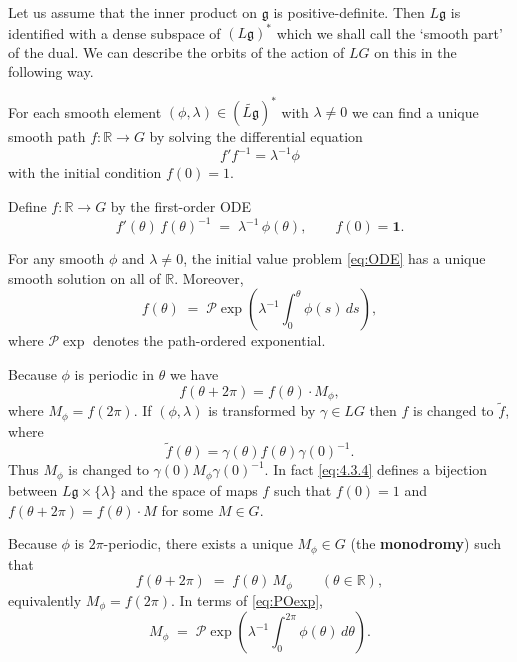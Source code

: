 \documentclass[12pt]{article}
\begin{document}
Let us assume that the inner product on $\mathfrak{g}$ is positive-definite.
Then $L\mathfrak{g}$ is identified with a dense subspace of $(L\mathfrak{g})^*$
which we shall call the ‘smooth part’ of the dual. We can describe the orbits of
the action of $LG$ on this in the following way.

For each smooth element $(\phi,\lambda) \in (\widetilde{L\mathfrak{g}})^*$
with $\lambda \neq 0$ we can find a unique smooth path $f : \mathbb{R} \to G$
by solving the differential equation
\begin{equation} \label{eq:4.3.4}
    f'f^{-1} = \lambda^{-1}\phi
\end{equation}
with the initial condition $f(0)=1$.

\begin{definition}
    Define $f:\mathbb R\to G$ by the first-order ODE
    \begin{equation}\label{eq:ODE}
        f'(\theta)\,f(\theta)^{-1} \;=\; \lambda^{-1}\,\phi(\theta),
        \qquad f(0)=\mathbf{1}.
    \end{equation}
\end{definition}

\begin{lemma}
    For any smooth $\phi$ and $\lambda\neq 0$, the initial value problem
    \eqref{eq:ODE} has a unique smooth solution on all of $\mathbb R$. Moreover,
    \begin{equation}\label{eq:POexp}
        f(\theta) \;=\; \mathcal P\exp\!\left(\lambda^{-1}
        \int_0^\theta \phi(s)\,ds\right),
    \end{equation}
    where $\mathcal P\exp$ denotes the path-ordered exponential.
\end{lemma}

Because $\phi$ is periodic in $\theta$ we have
\[
    f(\theta+2\pi) = f(\theta)\cdot M_\phi,
\]
where $M_\phi = f(2\pi)$. If $(\phi,\lambda)$ is transformed by $\gamma \in LG$
then $f$ is changed to $\tilde{f}$, where
\begin{equation} \label{eq:4.3.5}
    \tilde{f}(\theta) = \gamma(\theta) f(\theta) \gamma(0)^{-1}.
\end{equation}
Thus $M_\phi$ is changed to $\gamma(0)M_\phi \gamma(0)^{-1}$. In fact
\eqref{eq:4.3.4} defines a bijection between $L\mathfrak{g} \times \{\lambda\}$
and the space of maps $f$ such that $f(0)=1$ and
$f(\theta+2\pi)=f(\theta)\cdot M$ for some $M \in G$.

\begin{definition}
    Because $\phi$ is $2\pi$-periodic, there exists a unique $M_\phi\in G$
    (the \textbf{monodromy}) such that
    \begin{equation}\label{eq:monodromy-eq}
        f(\theta+2\pi) \;=\; f(\theta)\,M_\phi \qquad (\theta\in\mathbb R),
    \end{equation}
    equivalently $M_\phi=f(2\pi)$. In terms of \eqref{eq:POexp},
    \begin{equation}\label{eq:monodromy-POexp}
        M_\phi \;=\; \mathcal P\exp\!\left(\lambda^{-1}
        \int_0^{2\pi}\phi(\theta)\,d\theta\right).
    \end{equation}
\end{definition}
\end{document}
